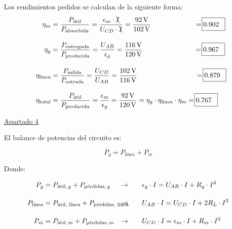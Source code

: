 \documentclass[10pt]{article}
\begin{document}
\vspace{5mm}

Los rendimientos pedidos se calculan de la siguiente forma:
\begin{align*}
    \eta_m &= \frac{P_{\textrm{útil}}}{P_{\textrm{absorbida}}} = \frac{\epsilon_m \cdot \bcancel{I}}{U_{CD} \cdot \bcancel{I}} = \frac{\qty{92}{\volt}}{\qty{102}{\volt}} \hspace{22mm} = \rlap{\kern-0.5ex\fbox{\rule[-2.5pt]{0pt}{12pt}\rule{27pt}{0pt}}} 0.902\\[10pt]
    \eta_g &= \frac{P_{\textrm{entregada}}}{P_{\textrm{producida}}} = \frac{U_{AB}}{\epsilon_g} = \frac{\qty{116}{\volt}}{\qty{120}{\volt}} \hspace{26.1mm}= \rlap{\kern-0.5ex\fbox{\rule[-2.5pt]{0pt}{12pt}\rule{27pt}{0pt}}} 0.967\\[10pt]
    \eta_{\textrm{línea}} &= \frac{P_{\textrm{salida}}}{P_{\textrm{entrada}}} = \frac{U_{CD}}{U_{AB}} = \frac{\qty{102}{\volt}}{\qty{116}{\volt}} \hspace{29.5mm} = \rlap{\kern-0.5ex\fbox{\rule[-2.5pt]{0pt}{12pt}\rule{27pt}{0pt}}} 0.879\\[10pt]
    \eta_{\textrm{total}} &= \frac{P_{\textrm{útil}}}{P_{\textrm{producida}}} = \frac{\epsilon_m}{\epsilon_g} = \frac{\qty{92}{\volt}}{\qty{120}{\volt}} = \eta_g \cdot \eta_{\textrm{línea}} \cdot \eta_m = \rlap{\kern-0.5ex\fbox{\rule[-2.5pt]{0pt}{12pt}\rule{27pt}{0pt}}} 0.767
\end{align*}

\vspace{6mm}

\underline{Apartado 4}

\vspace{5mm}

El balance de potencias del circuito es:

\[
  P_{g} = P_{\textrm{línea}} + P_{m} 
\]

Donde:

\begin{align*}
    P_{g} &= P_{\textrm{útil}, \, g} + P_{\textrm{pérdidas}, \, g} &\rightarrow  \qquad &\epsilon_g \cdot I = U_{AB} \cdot I + R_g \cdot I^2 \\[10pt]
    P_{\textrm{línea}} &= P_{\textrm{útil, línea}} + P_{\textrm{pérdidas, línea}} \hspace{-20mm} &\rightarrow \qquad &U_{AB} \cdot I = U_{CD} \cdot I + 2 R_L \cdot I^2\\[10pt]
    P_{m} &= P_{\textrm{útil}, \, m} + P_{\textrm{pérdidas}, \, m} &\rightarrow  \qquad &U_{CD} \cdot I = \epsilon_m \cdot I + R_m \cdot I^2 
\end{align*}
\end{document}
